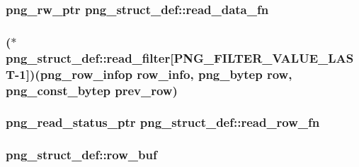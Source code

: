 \subsubsection[{read\+\_\+data\+\_\+fn}]{\setlength{\rightskip}{0pt plus 5cm}png\+\_\+rw\+\_\+ptr png\+\_\+struct\+\_\+def\+::read\+\_\+data\+\_\+fn}\label{structpng__struct__def_a83804076437d1587fab947c056bb56ae}
\hypertarget{structpng__struct__def_a669016ed081452035d16f3a93740d663}{}
\subsubsection[{read\+\_\+filter}]{($\ast$ png\+\_\+struct\+\_\+def\+::read\+\_\+filter\mbox{[}{\bf P\+N\+G\+\_\+\+F\+I\+L\+T\+E\+R\+\_\+\+V\+A\+L\+U\+E\+\_\+\+L\+A\+S\+T}-\/1\mbox{]})({\bf png\+\_\+row\+\_\+infop} row\+\_\+info, {\bf png\+\_\+bytep} row, {\bf png\+\_\+const\+\_\+bytep} {\bf prev\+\_\+row})}\label{structpng__struct__def_a669016ed081452035d16f3a93740d663}
\hypertarget{structpng__struct__def_a0d67c044d4088f4673b90c2109ff94c0}{}
\subsubsection[{read\+\_\+row\+\_\+fn}]{\setlength{\rightskip}{0pt plus 5cm}png\+\_\+read\+\_\+status\+\_\+ptr png\+\_\+struct\+\_\+def\+::read\+\_\+row\+\_\+fn}\label{structpng__struct__def_a0d67c044d4088f4673b90c2109ff94c0}
\hypertarget{structpng__struct__def_a05b648068595d5cf4400c0709cb0012d}{}
\subsubsection[{row\+\_\+buf}]{ png\+\_\+struct\+\_\+def\+::row\+\_\+buf}\label{structpng__struct__def_a05b648068595d5cf4400c0709cb0012d}
\hypertarget{structpng__struct__def_a0f06a454e8369cbbb90be4b5ab25654c}{}

